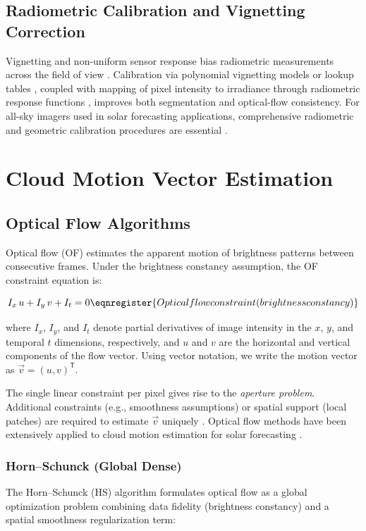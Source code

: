 \subsection{Radiometric Calibration and Vignetting Correction}
Vignetting and non-uniform sensor response bias radiometric measurements across the field of view \cite{kim2008,lebourgeois2008}. Calibration via polynomial vignetting models or lookup tables \cite{lebourgeois2008,kuusk2007}, coupled with mapping of pixel intensity to irradiance through radiometric response functions \cite{kim2008}, improves both segmentation and optical-flow consistency. For all-sky imagers used in solar forecasting applications, comprehensive radiometric and geometric calibration procedures are essential \cite{urquhart2015dev,urquhart2016}.

\section{Cloud Motion Vector Estimation}
\label{sec:cmv_estimation}

\subsection{Optical Flow Algorithms}
Optical flow (OF) estimates the apparent motion of brightness patterns between consecutive frames. Under the brightness constancy assumption, the OF constraint equation is:

\begin{equation}
I_x \, u + I_y \, v + I_t = 0
\eqnregister{Optical flow constraint (brightness constancy)}
\end{equation}

where $I_x$, $I_y$, and $I_t$ denote partial derivatives of image intensity in the $x$, $y$, and temporal $t$ dimensions, respectively, and $u$ and $v$ are the horizontal and vertical components of the flow vector. Using vector notation, we write the motion vector as $\vec{v}=(u,v)^{\mathsf{T}}$.

The single linear constraint per pixel gives rise to the \emph{aperture problem}. Additional constraints (e.g., smoothness assumptions) or spatial support (local patches) are required to estimate $\vec{v}$ uniquely \cite{horn1981determining}. Optical flow methods have been extensively applied to cloud motion estimation for solar forecasting \cite{urquhart2015,marquez2013}.


\subsubsection{Horn--Schunck (Global Dense)}
The Horn--Schunck (HS) algorithm formulates optical flow as a global optimization problem combining data fidelity (brightness constancy) and a spatial smoothness regularization term:

